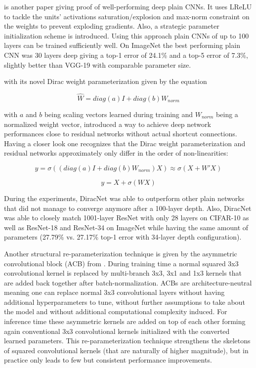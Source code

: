 \cite{OyebadeOyedotun.2020} is another paper giving proof of well-performing deep plain CNNs. It uses LReLU to tackle the units' activations saturation/explosion and max-norm constraint on the weights to prevent exploding gradients. Also, a strategic parameter initialization scheme is introduced. Using this approach plain CNNs of up to 100 layers can be trained sufficiently well. On ImageNet \cite{JiaDeng.2009} the best performing plain CNN was 30 layers deep giving a top-1 error of 24.1\% and a top-5 error of 7.3\%, slightly better than VGG-19 with comparable parameter size. \cite{OyebadeOyedotun.2020}

\cite{SergeyZagoruyko.2018} with its novel Dirac weight parameterization given by the equation 

\begin{equation}
	\hat{W} = diag(a)I + diag(b)W_{norm}
\end{equation}

with $a$ and $b$ being scaling vectors learned during training and $W_{norm}$ being a normalized weight vector, introduced a way to achieve deep network performances close to residual networks without actual shortcut connections. Having a closer look one recognizes that the Dirac weight parameterization and residual networks approximately only differ in the order of non-linearities:

\begin{equation}
	y = \sigma((diag(a)I + diag(b)W_{norm}) X) \approx \sigma(X + W'X)
\end{equation}

\begin{equation}
	y = X + \sigma(WX)
\end{equation}

During the experiments, DiracNet was able to outperform other plain networks that did not manage to converge anymore after a 100-layer depth. Also, DiracNet was able to closely match 1001-layer ResNet with only 28 layers on CIFAR-10 \cite{AlexKrizhevsky.2009} as well as ResNet-18 and ResNet-34 on ImageNet while having the same amount of parameters (27.79\% vs. 27.17\% top-1 error with 34-layer depth configuration). \cite{SergeyZagoruyko.2018}

Another structural re-parameterization technique is given by the asymmetric convolutional block (ACB) from \cite{XiaohanDing.2019}. During training time a normal squared 3x3 convolutional kernel is replaced by multi-branch 3x3, 3x1 and 1x3 kernels that are added back together after batch-normalization. ACBs are architecture-neutral meaning one can replace normal 3x3 convolutional layers without having additional hyperparameters to tune, without further assumptions to take about the model and without additional computational complexity induced. For inference time these asymmetric kernels are added on top of each other forming again conventional 3x3 convolutional kernels initialized with the converted learned parameters. This re-parameterization technique strengthens the skeletons of squared convolutional kernels (that are naturally of higher magnitude), but in practice only leads to few but consistent performance improvements. \cite{XiaohanDing.2019}

